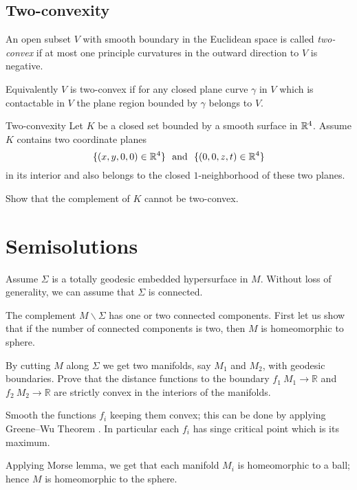 \subsection*{Two-convexity\many}

An open subset $V$ with smooth boundary in the Euclidean space  
is called \emph{two-convex} if at most one principle curvatures in the outward direction to $V$ is negative.

Equivalently $V$ is two-convex if for any closed plane curve $\gamma$ in $V$ which is contactable in $V$ 
the plane region bounded by $\gamma$ belongs to $V$.

\begin{pr}{\many}{Two-convexity}\label{Two-convexity}
Let $K$ be a closed set bounded by a smooth surface
in $\mathbb{R}^4$.
Assume $K$ contains two coordinate planes $$\{(x,y,0,0)\in\RR^4\}\ \ 
\text{and}
\ \ \{(0,0,z,t)\in\RR^4\}$$
in its interior 
and also belongs to the closed $1$-neighborhood of these two planes.

Show that the complement of $K$ cannot be two-convex.
\end{pr}

\section*{Semisolutions}



Assume $\Sigma$ is a totally geodesic embedded hypersurface in $M$.
Without loss of generality, we can assume that $\Sigma$ is connected.

The complement $M\backslash\Sigma$ has one or two connected components.
First let us show that if the number of connected components is two, 
then $M$ is homeomorphic to sphere.

By cutting $M$ along $\Sigma$ 
we get two manifolds, say $M_1$ and $M_2$,
with geodesic boundaries. 
Prove that the distance functions to the boundary 
$f_1\:M_1\to\mathbb{R}$ and $f_2\:M_2\to\mathbb{R}$ are strictly convex in the interiors of the manifolds.

Smooth the functions $f_i$ keeping them convex; 
this can be done by applying Greene--Wu Theorem \cite[see Thm. 2 in][]{greene-wu}.
In particular each $f_i$ has singe critical point which is its maximum.

Applying Morse lemma, we get that each manifold $M_i$ is homeomorphic to a ball; 
hence $M$ 
is homeomorphic to the sphere.


